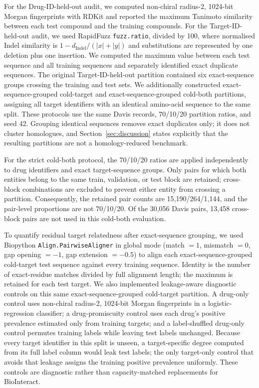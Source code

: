 \documentclass[fleqn,10pt]{wlscirep}
\begin{document}
For the Drug-ID-held-out audit, we computed non-chiral radius-2, 1024-bit Morgan
fingerprints with RDKit and
reported the maximum Tanimoto similarity between each test compound and the
training compounds. For the Target-ID-held-out audit, we used RapidFuzz
\texttt{fuzz.ratio}, divided by 100, where normalised Indel similarity is
$1-d_\mathrm{Indel}/(|x|+|y|)$ and substitutions are represented by one
deletion plus one insertion. We computed the maximum value between each test
sequence and all training sequences and separately identified exact duplicate
sequences. The original
Target-ID-held-out partition contained six exact-sequence groups crossing the
training and test sets. We additionally constructed exact-sequence-grouped cold-target
and exact-sequence-grouped cold-both partitions, assigning all target identifiers with an identical
amino-acid sequence to the same split.
These protocols use the same Davis records, 70/10/20 partition ratios, and
seed 42.  Grouping identical sequences removes exact duplicates only; it does
not cluster homologues, and Section~\ref{sec:discussion} states explicitly that
the resulting partitions are not a homology-reduced benchmark.

For the strict cold-both protocol, the 70/10/20 ratios are applied independently
to drug identifiers and exact target-sequence groups. Only pairs for which both
entities belong to the same train, validation, or test block are retained;
cross-block combinations are excluded to prevent either entity from crossing a
partition. Consequently, the retained pair counts are 15{,}190/264/1{,}144,
and the pair-level proportions are not 70/10/20. Of the 30{,}056 Davis pairs,
13{,}458 cross-block pairs are not used in this cold-both evaluation.

To quantify residual target relatedness after exact-sequence grouping, we used
Biopython \texttt{Align.PairwiseAligner} in global mode (match $=1$, mismatch
$=0$, gap opening $=-1$, gap extension $=-0.5$) to align each
exact-sequence-grouped cold-target
test sequence against every training sequence. Identity is the number of
exact-residue matches divided by full alignment length; the maximum is retained
for each test target. We also implemented leakage-aware diagnostic controls on
this same exact-sequence-grouped cold-target partition. A drug-only control uses non-chiral
radius-2, 1024-bit
Morgan fingerprints in a logistic-regression classifier; a drug-promiscuity
control uses each drug's positive prevalence estimated only from training
targets; and a label-shuffled drug-only control permutes training labels while
leaving test labels unchanged.  Because every target identifier in this split
is unseen, a target-specific degree computed from its full label column would
leak test labels; the only target-only control that avoids that leakage assigns
the training positive prevalence uniformly.  These controls are diagnostic
rather than capacity-matched replacements for BioInteract.
\end{document}

